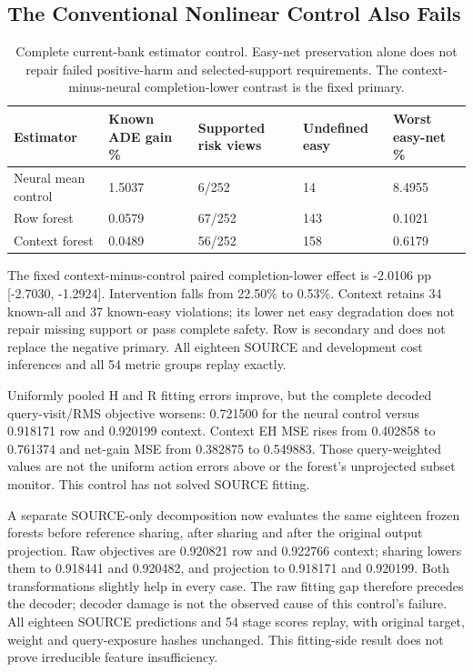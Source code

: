 \documentclass[10pt,twocolumn,letterpaper]{article}
\begin{document}
\subsection{The Conventional Nonlinear Control Also Fails}
\begin{table}[!t]\centering\small
\begin{tabularx}{\textwidth}{@{}XXXXX@{}}\toprule
Estimator & Known ADE gain \% & Supported risk views & Undefined easy & Worst easy-net \% \\
\midrule
Neural mean control & 1.5037 & 6/252 & 14 & 8.4955 \\
Row forest & 0.0579 & 67/252 & 143 & 0.1021 \\
Context forest & 0.0489 & 56/252 & 158 & 0.6179 \\
\bottomrule\end{tabularx}
\caption{Complete current-bank estimator control. Easy-net preservation alone does not repair failed positive-harm and selected-support requirements. The context-minus-neural completion-lower contrast is the fixed primary.}\end{table}
The fixed context-minus-control paired completion-lower effect is -2.0106 pp
[-2.7030, -1.2924]. Intervention falls from 22.50\% to 0.53\%. Context retains
34 known-all and 37 known-easy violations; its lower net easy degradation
does not repair missing support or pass complete safety. Row is secondary and
does not replace the negative primary. All eighteen SOURCE and development
cost inferences and all 54 metric groups replay exactly.

Uniformly pooled H and R fitting errors improve, but the complete decoded
query-visit/RMS objective worsens: 0.721500 for the neural control versus
0.918171 row and 0.920199 context. Context EH MSE rises from 0.402858 to
0.761374 and net-gain MSE from 0.382875 to 0.549883. Those query-weighted values
are not the uniform action errors above or the forest's unprojected subset
monitor. This control has not solved SOURCE fitting.

A separate SOURCE-only decomposition now evaluates the same eighteen frozen
forests before reference sharing, after sharing and after the original output
projection. Raw objectives are 0.920821 row and 0.922766 context; sharing lowers
them to 0.918441 and 0.920482, and projection to 0.918171 and 0.920199. Both
transformations slightly help in every case. The raw fitting gap therefore
precedes the decoder; decoder damage is not the observed cause of this control's
failure. All eighteen SOURCE predictions and 54 stage scores replay, with
original target, weight and query-exposure hashes unchanged. This fitting-side
result does not prove irreducible feature insufficiency.
\end{document}
